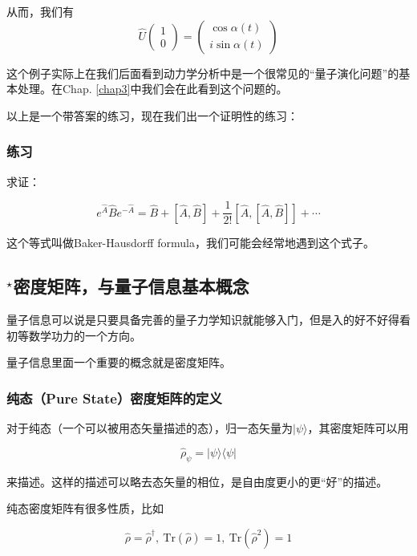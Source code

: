 从而，我们有
\begin{equation}
\hat U \left(\begin{matrix}1 \\0\end{matrix}\right)  =  \left(\begin{matrix}\cos\alpha(t) \\ i \sin\alpha(t)\end{matrix}\right)
\end{equation}

这个例子实际上在我们后面看到动力学分析中是一个很常见的``量子演化问题''的基本处理。在Chap. {\ref{chap3}}中我们会在此看到这个问题的。


以上是一个带答案的练习，现在我们出一个证明性的练习：

\subsubsection{练习}
求证：

\begin{equation}
e^{\hat A}\hat B e^{-\hat A} = \hat{B} + [\hat A,\hat B] + \frac{1}{2!} [\hat A, [\hat A,\hat B]] + \cdots
\end{equation}

这个等式叫做Baker-Hausdorff formula，我们可能会经常地遇到这个式子。


\subsection{$^\star$密度矩阵，与量子信息基本概念}

量子信息可以说是只要具备完善的量子力学知识就能够入门，但是入的好不好得看初等数学功力的一个方向。

量子信息里面一个重要的概念就是密度矩阵。

\subsubsection{纯态（Pure State）密度矩阵的定义}
对于纯态（一个可以被用态矢量描述的态），归一态矢量为$|\psi\rangle$，其密度矩阵可以用

\begin{equation}
\hat\rho_{\psi} = |\psi\rangle\langle\psi|
\end{equation}

来描述。这样的描述可以略去态矢量的相位，是自由度更小的更“好”的描述。

纯态密度矩阵有很多性质，比如

\begin{equation}
\hat\rho = \hat\rho^{\dagger},\ \text{Tr}(\hat\rho) = 1,\ \text{Tr}(\hat\rho^2) = 1
\end{equation}

